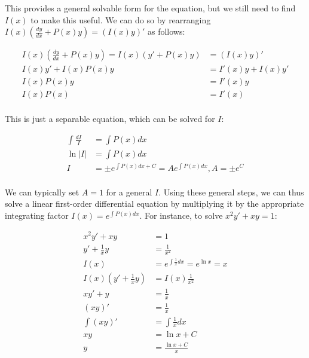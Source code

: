 \documentclass[12pt]{article}
\begin{document}
This provides a general solvable form for the equation, but we still need to find $I(x)$ to make this useful. We can do so by rearranging $I(x)(\frac{dy}{dx} + P(x)y) = (I(x)y)'$ as follows:

\begin{equation}
    \begin{split}
    I(x)(\frac{dy}{dx} + P(x)y) = I(x)(y'+P(x)y) &= (I(x)y)'\\
    I(x)y' + I(x)P(x)y &= I'(x)y+I(x)y'\\
    I(x)P(x)y &= I'(x)y\\
    I(x)P(x) &= I'(x)\\
    \end{split}
\end{equation}

This is just a separable equation, which can be solved for $I$:

\begin{equation}
    \begin{split}
        \int \frac{dI}{I} &= \int P(x) dx\\
        \ln |I| &= \int P(x) dx \\
        I  &= \pm e^{\int P(x) dx + C} = Ae^{\int P(x) dx}, A=\pm e^{C}\\
    \end{split}
\end{equation}

We can typically set $A=1$ for a general $I$. Using these general steps, we can thus solve a linear first-order differential equation by multiplying it by the appropriate integrating factor $I(x) = e^{\int P(x) dx}$. For instance, to solve $x^2y'+xy=1$:

\begin{equation}
    \begin{split}
        x^2y'+xy &= 1\\
        y' + \frac{1}{x}y &= \frac{1}{x^2}\\
        I(x) &= e^{\int \frac{1}{x} dx} = e^{\ln x} = x\\
        I(x)(y' + \frac{1}{x}y) &= I(x)\frac{1}{x^2}\\
        xy'+y &= \frac{1}{x}\\
        (xy)' &= \frac{1}{x}\\
        \int (xy)' &= \int \frac{1}{x} dx\\
        xy &= \ln x + C\\
        y &= \frac{\ln x + C}{x}\\
    \end{split}
\end{equation}
\end{document}

